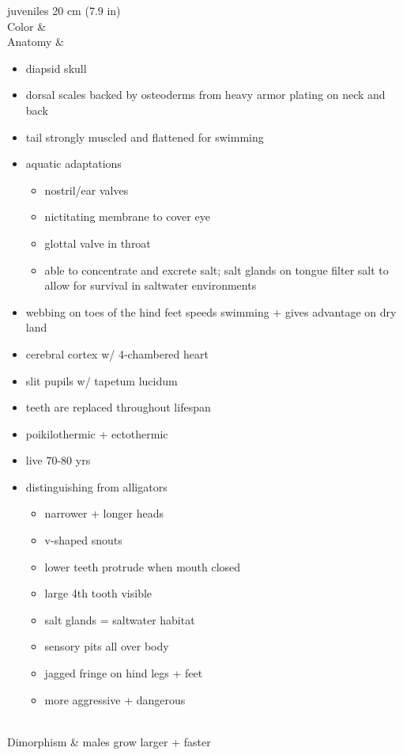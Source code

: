 \begin{center}
\begin{longtabu}
	juveniles 20 cm (7.9 in)
	\\
	\hline
	Color & \\
	\hline
	Anatomy & 
	\begin{itemize}[noitemsep]
		\item diapsid skull
		\item dorsal scales backed by osteoderms from heavy armor plating on neck and back
		\item tail strongly muscled and flattened for swimming
		\item aquatic adaptations
			\begin{itemize}[noitemsep]
			\item nostril/ear valves
			\item nictitating membrane to cover eye
			\item glottal valve in throat
			\item able to concentrate and excrete salt; salt glands on tongue filter salt to allow for survival in saltwater environments
			\end{itemize}
		\item webbing on toes of the hind feet speeds swimming + gives advantage on dry land
		\item cerebral cortex w/ 4-chambered heart
		\item slit pupils w/ tapetum lucidum
		\item teeth are replaced throughout lifespan
		\item poikilothermic + ectothermic
		\item live 70-80 yrs
		\item distinguishing from alligators
			\begin{itemize}[noitemsep]
			\item narrower + longer heads
			\item v-shaped snouts
			\item lower teeth protrude when mouth closed
			\item large 4th tooth visible
			\item salt glands = saltwater habitat
			\item sensory pits all over body
			\item jagged fringe on hind legs + feet
			\item more aggressive + dangerous
			\end{itemize}
	\end{itemize}
	\\	
	\hline
	Dimorphism & 
	males grow larger + faster
	\\

\end{longtabu}
\end{center}
